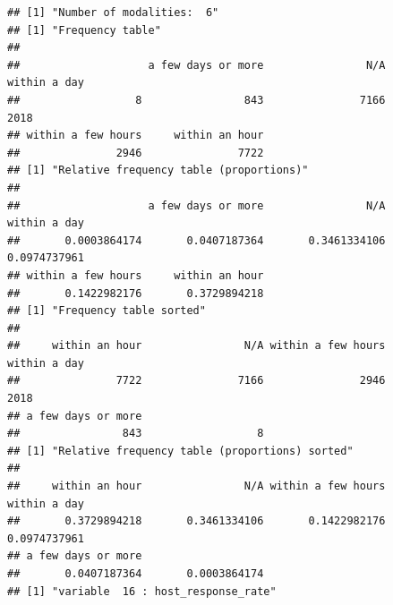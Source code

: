 \begin{verbatim}
## [1] "Number of modalities:  6"
## [1] "Frequency table"
## 
##                    a few days or more                N/A       within a day 
##                  8                843               7166               2018 
## within a few hours     within an hour 
##               2946               7722 
## [1] "Relative frequency table (proportions)"
## 
##                    a few days or more                N/A       within a day 
##       0.0003864174       0.0407187364       0.3461334106       0.0974737961 
## within a few hours     within an hour 
##       0.1422982176       0.3729894218 
## [1] "Frequency table sorted"
## 
##     within an hour                N/A within a few hours       within a day 
##               7722               7166               2946               2018 
## a few days or more                    
##                843                  8 
## [1] "Relative frequency table (proportions) sorted"
## 
##     within an hour                N/A within a few hours       within a day 
##       0.3729894218       0.3461334106       0.1422982176       0.0974737961 
## a few days or more                    
##       0.0407187364       0.0003864174 
## [1] "variable  16 : host_response_rate"
\end{verbatim}

